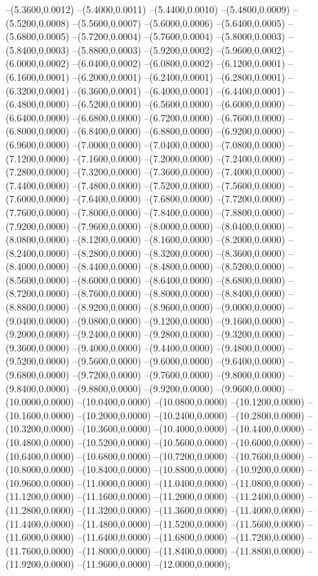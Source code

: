 {	--(5.3600,0.0012)
	--(5.4000,0.0011)
	--(5.4400,0.0010)
	--(5.4800,0.0009)
	--(5.5200,0.0008)
	--(5.5600,0.0007)
	--(5.6000,0.0006)
	--(5.6400,0.0005)
	--(5.6800,0.0005)
	--(5.7200,0.0004)
	--(5.7600,0.0004)
	--(5.8000,0.0003)
	--(5.8400,0.0003)
	--(5.8800,0.0003)
	--(5.9200,0.0002)
	--(5.9600,0.0002)
	--(6.0000,0.0002)
	--(6.0400,0.0002)
	--(6.0800,0.0002)
	--(6.1200,0.0001)
	--(6.1600,0.0001)
	--(6.2000,0.0001)
	--(6.2400,0.0001)
	--(6.2800,0.0001)
	--(6.3200,0.0001)
	--(6.3600,0.0001)
	--(6.4000,0.0001)
	--(6.4400,0.0001)
	--(6.4800,0.0000)
	--(6.5200,0.0000)
	--(6.5600,0.0000)
	--(6.6000,0.0000)
	--(6.6400,0.0000)
	--(6.6800,0.0000)
	--(6.7200,0.0000)
	--(6.7600,0.0000)
	--(6.8000,0.0000)
	--(6.8400,0.0000)
	--(6.8800,0.0000)
	--(6.9200,0.0000)
	--(6.9600,0.0000)
	--(7.0000,0.0000)
	--(7.0400,0.0000)
	--(7.0800,0.0000)
	--(7.1200,0.0000)
	--(7.1600,0.0000)
	--(7.2000,0.0000)
	--(7.2400,0.0000)
	--(7.2800,0.0000)
	--(7.3200,0.0000)
	--(7.3600,0.0000)
	--(7.4000,0.0000)
	--(7.4400,0.0000)
	--(7.4800,0.0000)
	--(7.5200,0.0000)
	--(7.5600,0.0000)
	--(7.6000,0.0000)
	--(7.6400,0.0000)
	--(7.6800,0.0000)
	--(7.7200,0.0000)
	--(7.7600,0.0000)
	--(7.8000,0.0000)
	--(7.8400,0.0000)
	--(7.8800,0.0000)
	--(7.9200,0.0000)
	--(7.9600,0.0000)
	--(8.0000,0.0000)
	--(8.0400,0.0000)
	--(8.0800,0.0000)
	--(8.1200,0.0000)
	--(8.1600,0.0000)
	--(8.2000,0.0000)
	--(8.2400,0.0000)
	--(8.2800,0.0000)
	--(8.3200,0.0000)
	--(8.3600,0.0000)
	--(8.4000,0.0000)
	--(8.4400,0.0000)
	--(8.4800,0.0000)
	--(8.5200,0.0000)
	--(8.5600,0.0000)
	--(8.6000,0.0000)
	--(8.6400,0.0000)
	--(8.6800,0.0000)
	--(8.7200,0.0000)
	--(8.7600,0.0000)
	--(8.8000,0.0000)
	--(8.8400,0.0000)
	--(8.8800,0.0000)
	--(8.9200,0.0000)
	--(8.9600,0.0000)
	--(9.0000,0.0000)
	--(9.0400,0.0000)
	--(9.0800,0.0000)
	--(9.1200,0.0000)
	--(9.1600,0.0000)
	--(9.2000,0.0000)
	--(9.2400,0.0000)
	--(9.2800,0.0000)
	--(9.3200,0.0000)
	--(9.3600,0.0000)
	--(9.4000,0.0000)
	--(9.4400,0.0000)
	--(9.4800,0.0000)
	--(9.5200,0.0000)
	--(9.5600,0.0000)
	--(9.6000,0.0000)
	--(9.6400,0.0000)
	--(9.6800,0.0000)
	--(9.7200,0.0000)
	--(9.7600,0.0000)
	--(9.8000,0.0000)
	--(9.8400,0.0000)
	--(9.8800,0.0000)
	--(9.9200,0.0000)
	--(9.9600,0.0000)
	--(10.0000,0.0000)
	--(10.0400,0.0000)
	--(10.0800,0.0000)
	--(10.1200,0.0000)
	--(10.1600,0.0000)
	--(10.2000,0.0000)
	--(10.2400,0.0000)
	--(10.2800,0.0000)
	--(10.3200,0.0000)
	--(10.3600,0.0000)
	--(10.4000,0.0000)
	--(10.4400,0.0000)
	--(10.4800,0.0000)
	--(10.5200,0.0000)
	--(10.5600,0.0000)
	--(10.6000,0.0000)
	--(10.6400,0.0000)
	--(10.6800,0.0000)
	--(10.7200,0.0000)
	--(10.7600,0.0000)
	--(10.8000,0.0000)
	--(10.8400,0.0000)
	--(10.8800,0.0000)
	--(10.9200,0.0000)
	--(10.9600,0.0000)
	--(11.0000,0.0000)
	--(11.0400,0.0000)
	--(11.0800,0.0000)
	--(11.1200,0.0000)
	--(11.1600,0.0000)
	--(11.2000,0.0000)
	--(11.2400,0.0000)
	--(11.2800,0.0000)
	--(11.3200,0.0000)
	--(11.3600,0.0000)
	--(11.4000,0.0000)
	--(11.4400,0.0000)
	--(11.4800,0.0000)
	--(11.5200,0.0000)
	--(11.5600,0.0000)
	--(11.6000,0.0000)
	--(11.6400,0.0000)
	--(11.6800,0.0000)
	--(11.7200,0.0000)
	--(11.7600,0.0000)
	--(11.8000,0.0000)
	--(11.8400,0.0000)
	--(11.8800,0.0000)
	--(11.9200,0.0000)
	--(11.9600,0.0000)
	--(12.0000,0.0000);
}
